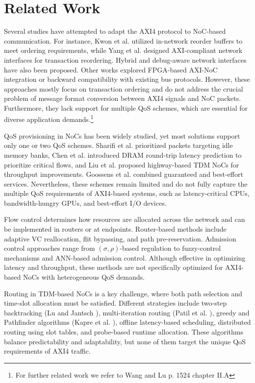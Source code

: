 \section{Related Work}

Several studies have attempted to adapt the AXI4 protocol to NoC-based communication. For instance, Kwon et al.\cite{yang_nisar_2007} utilized in-network reorder buffers to meet ordering requirements, while Yang et al.\cite{kwon_-network_2009} designed AXI-compliant network interfaces for transaction reordering. Hybrid and debug-aware network interfaces have also been proposed. 
Other works explored FPGA-based AXI-NoC integration or backward compatibility with existing bus protocols. However, these approaches mostly focus on transaction ordering and do not address the crucial problem of message format conversion between AXI4 signals and NoC packets. Furthermore, they lack support for multiple QoS schemes, which are essential for diverse application demands.\footnote{For further related work we refer to Wang and Lu p. 1524 chapter II.A} 


QoS provisioning in NoCs has been widely studied, yet most solutions support only one or two QoS schemes. Sharifi et al.\cite{sharifi_addressing_2012} prioritized packets targeting idle memory banks, Chen et al.\cite{chen_round-trip_2017} introduced DRAM round-trip latency prediction to prioritize critical flows, and Liu et al.\cite{liu_highway_2015} proposed highway-based TDM NoCs for throughput improvements. Goossens et al.\cite{goossens_aethereal_2005} combined guaranteed and best-effort services. Nevertheless, these schemes remain limited and do not fully capture the multiple QoS requirements of AXI4-based systems, such as latency-critical CPUs, bandwidth-hungry GPUs, and best-effort I/O devices. 


Flow control determines how resources are allocated across the network and can be implemented in routers or at endpoints. Router-based methods include adaptive VC reallocation, flit bypassing, and path pre-reservation. Admission control approaches range from $(\sigma,\rho)$-based regulation to fuzzy-control mechanisms and ANN-based admission control. Although effective in optimizing latency and throughput, these methods are not specifically optimized for AXI4-based NoCs with heterogeneous QoS demands. 


Routing in TDM-based NoCs is a key challenge, where both path selection and time-slot allocation must be satisfied. Different strategies include two-step backtracking (Lu and Jantsch \cite{lu_tdm_2008}), multi-iteration routing (Patil et al. \cite{patil_bandwidth-optimized_2018}), greedy and Pathfinder algorithms (Kapre et al. \cite{kapre_packet_2006}), offline latency-based scheduling, distributed routing using slot tables, and probe-based runtime allocation. These algorithms balance predictability and adaptability, but none of them target the unique QoS requirements of AXI4 traffic. 


